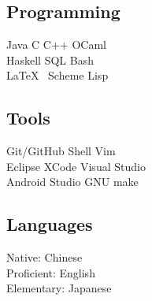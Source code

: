 \documentclass[]{deedy-resume-openfont}
\begin{document}
\begin{minipage}[t]{0.33\textwidth}
\subsection{Programming}
Java    \textbullet{}   C    \textbullet{} C++ \textbullet{} OCaml \\
Haskell \textbullet{} SQL    \textbullet{} Bash \\
\LaTeX\ \textbullet{} Scheme \textbullet{} Lisp \\
\sectionsep
\subsection{Tools}
Git/GitHub \textbullet{} Shell \textbullet{} Vim\\  Eclipse \textbullet{} XCode \textbullet{} Visual Studio\\
Android Studio \textbullet{} GNU make \\
\sectionsep
\subsection{Languages}
\textbullet{} Native: Chinese \\
\textbullet{} Proficient: English \\
\textbullet{} Elementary: Japanese \\
\sectionsep 



%
%

\end{minipage} 
\hfill
\end{document}
